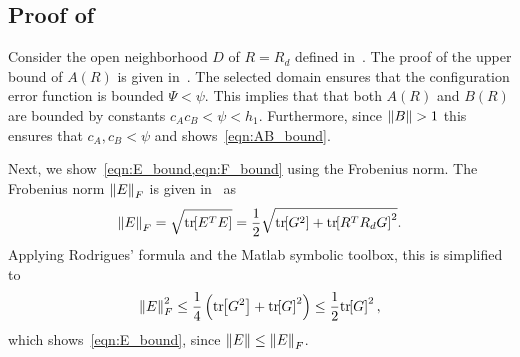 	
\subsection{Proof of~}\label{proof:eR_dot_bound}


Consider the open neighborhood $D$ of $R=R_d$ defined in~.
The proof of the upper bound of \( A(R) \) is given in~\cite{LeeITCST13}.
The selected domain ensures that the configuration error function is bounded \( \Psi < \psi \).
This implies that that both \( A(R) \) and \( B(R) \) are bounded by constants \( c_A c_B < \psi < h_1\).
Furthermore, since \( \left\| B \right\| > 1 \) this ensures that \( c_A, c_B < \psi\) and shows~\cref{eqn:AB_bound}.

Next, we show~\cref{eqn:E_bound,eqn:F_bound} using the Frobenius norm.
The Frobenius norm \( \left\| E \right\|_F \) is given in~\cite{LeeITCST13} as
\begin{gather*}
	\left\| E \right\|_F = \sqrt{\mathrm{tr}\negthickspace\left[ E^T E \right]} = \frac{1}{2} \sqrt{\mathrm{tr}\negthickspace\left[ G^2 \right] + \mathrm{tr}\negthickspace\left[ R^T R_d G \right]^2}.
\end{gather*}
Applying Rodrigues' formula and the Matlab symbolic toolbox, this is simplified to
\begin{gather*}
	\left\| E \right\|^2_F \leq \frac{1}{4} \left( \mathrm{tr}\negthickspace\left[ G^2 \right] + \mathrm{tr}\negthickspace\left[ G \right]^2 \right) \leq \frac{1}{2} \mathrm{tr}\negthickspace\left[ G \right]^2 ,
\end{gather*}
which shows~\cref{eqn:E_bound}, since \( \left\| E \right\| \leq \left\| E \right\|_F \).

